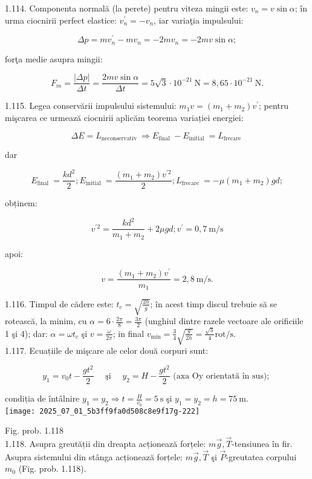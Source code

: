 1.114. Componenta normală (la perete) pentru viteza mingii este: $v_{n}=v \sin \alpha$; în urma ciocnirii perfect elastice: $v_{n}^{\prime}=-v_{n}$, iar variaţia impulsului:

$$
\Delta p=m v_{n}^{\prime}-m v_{n}=-2 m v_{n}=-2 m v \sin \alpha ;
$$

forţa medie asupra mingii:

$$
F_{m}=\frac{|\Delta p|}{\Delta t}=\frac{2 m v \sin \alpha}{\Delta t}=5 \sqrt{3} \cdot 10^{-21} \mathrm{~N}=8,65 \cdot 10^{-21} \mathrm{~N} .
$$

1.115. Legea conservării impulsului sistemului: $m_{1} v=\left(m_{1}+m_{2}\right) v^{\prime}$; pentru mişcarea ce urmează ciocnirii aplicăm teorema variației energiei:

$$
\Delta E=L_{\text {neconservativ }} \Rightarrow E_{\text {final }}-E_{\text {initial }}=L_{\text {frecare }}
$$

dar

$$
E_{\text {final }}=\frac{k d^{2}}{2} ; E_{\text {initial }}=\frac{\left(m_{1}+m_{2}\right) v^{\prime 2}}{2} ; L_{\text {frecare }}=-\mu\left(m_{1}+m_{2}\right) g d ;
$$

obținem:

$$
v^{\prime 2}=\frac{k d^{2}}{m_{1}+m_{2}}+2 \mu g d ; v^{\prime}=0,7 \mathrm{~m} / \mathrm{s}
$$

apoi:

$$
v=\frac{\left(m_{1}+m_{2}\right) v^{\prime}}{m_{1}}=2,8 \mathrm{~m} / \mathrm{s} .
$$

1.116. Timpul de cădere este: $t_{c}=\sqrt{\frac{2 h}{g}}$; în acest timp discul trebuie să se rotească, la minim, cu $\alpha=6 \cdot \frac{2 \pi}{8}=\frac{3 \pi}{2}$ (unghiul dintre razele vectoare ale orificiile 1 şi 4); dar: $\alpha=\omega t_{c}$ şi $v=\frac{\omega}{2 \pi}$; in final $v_{\min }=\frac{3}{4} \sqrt{\frac{g}{2 h}}=\frac{\sqrt{3}}{4} \mathrm{rot} / \mathrm{s}$.\\
1.117. Ecuațiile de mişcare ale celor două corpuri sunt:

$$
y_{1}=v_{0} t-\frac{g t^{2}}{2} \quad \text { şi } \quad y_{2}=H-\frac{g t^{2}}{2} \text { (axa Oy orientată în sus); }
$$

condiția de întâlnire $y_{1}=y_{2} \Rightarrow t=\frac{H}{v_{0}}=5 \mathrm{~s}$ şi $y_{1}=y_{2}=h=75 \mathrm{~m}$.\\
\texttt{[image: 2025\_07\_01\_5b3ff9fa0d508c8e9f17g-222]}

Fig. prob. 1.118\\
1.118. Asupra greutății din dreapta acționează forțele: $m \vec{g}, \vec{T}$-tensiunea în fir. Asupra sistemului din stânga acționează forțele: $m \vec{g}, \vec{T}$ şi $\vec{P}$-greutatea corpului $m_{0}$ (Fig. prob. 1.118).


